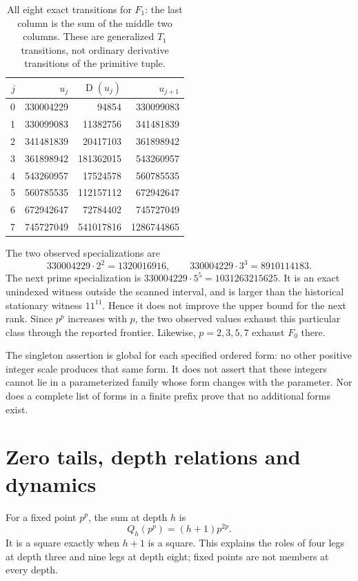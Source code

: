 \documentclass[11pt]{article}
\newcommand{\D}{\operatorname{D}}
\theoremstyle{definition}
\theoremstyle{remark}
\begin{document}
\begin{table}[htbp]
\centering\small
\begin{tabular}{rrrr}
\toprule
$j$ & $u_j$ & $\D(u_j)$ & $u_{j+1}$\\
\midrule
0&330004229&94854&330099083\\
1&330099083&11382756&341481839\\
2&341481839&20417103&361898942\\
3&361898942&181362015&543260957\\
4&543260957&17524578&560785535\\
5&560785535&112157112&672942647\\
6&672942647&72784402&745727049\\
7&745727049&541017816&1286744865\\
\bottomrule
\end{tabular}
\caption{All eight exact transitions for $F_1$: the last column is the
sum of the middle two columns. These are generalized $T_1$ transitions,
not ordinary derivative transitions of the primitive tuple.}
\label{tab:seed}
\end{table}

The two observed specializations are
\[
 330004229\cdot2^2=1320016916,
 \qquad330004229\cdot3^3=8910114183.
\]
The next prime specialization is
$330004229\cdot5^5=1031263215625$. It is an exact unindexed
witness outside the scanned interval, and is larger than the
historical stationary witness $11^{11}$. Hence it does not improve
the upper bound for the next rank. Since $p^p$ increases with $p$,
the two observed values exhaust this particular class through the
reported frontier. Likewise, $p=2,3,5,7$ exhaust $F_0$ there.

The singleton assertion is global for each specified ordered form:
no other positive integer scale produces that same form. It does not
assert that these integers cannot lie in a parameterized family whose
form changes with the parameter. Nor does a complete list of forms in
a finite prefix prove that no additional forms exist.

\section{Zero tails, depth relations and dynamics}\label{sec:depth}

For a fixed point $p^p$, the sum at depth $h$ is
\begin{equation}\label{eq:stationarydepth}
 Q_h(p^p)=(h+1)p^{2p}.
\end{equation}
It is a square exactly when $h+1$ is a square. This explains the
roles of four legs at depth three and nine legs at depth eight;
fixed points are not members at every depth.
\end{document}
